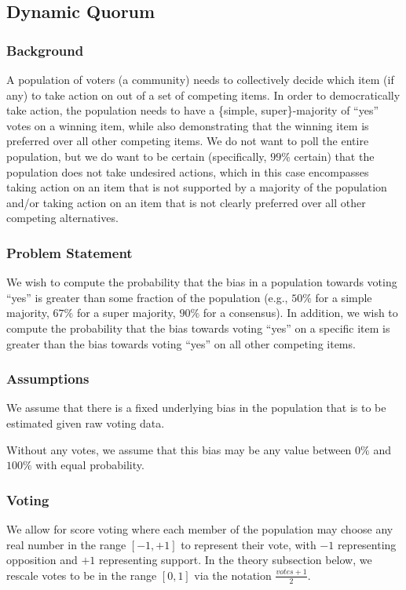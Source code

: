 \documentclass{sigchi}
\begin{document}
\subsection{Dynamic Quorum}

\subsubsection{Background}
A population of voters (a community) needs to collectively decide which item (if any) to take action on out of a set of competing items.
In order to democratically take action, the population needs to have a \{simple, super\}-majority of ``yes'' votes on a
winning item, while also demonstrating that the winning item is preferred over all other competing items.
We do not want to poll the entire population, but we do want to be certain (specifically, $99\%$ certain) that
the population does not take undesired actions, which in this case encompasses taking action on an item that is not
supported by a majority of the population and/or taking action on an item that is not clearly preferred over all
other competing alternatives.

\subsubsection{Problem Statement}
We wish to compute the probability that the bias in a population towards voting ``yes'' is greater than some
fraction of the population (e.g., $50\%$ for a simple majority, $67\%$ for a super majority, $90\%$ for a consensus).
In addition, we wish to compute the probability that the bias towards voting ``yes'' on a specific item is greater
than the bias towards voting ``yes'' on all other competing items.

\subsubsection{Assumptions}
We assume that there is a fixed underlying bias in the population that is to be estimated given raw voting data.

Without any votes, we assume that this bias may be any value between $0\%$ and $100\%$ with equal probability.

\subsubsection{Voting}
We allow for score voting where each member of the population may choose any real number in the range $[-1,+1]$ to
represent their vote, with $-1$ representing opposition and $+1$ representing support.
In the theory subsection below, we rescale votes to be in the range $[0,1]$ via the notation $\frac{votes + 1}{2}$.
\end{document}
